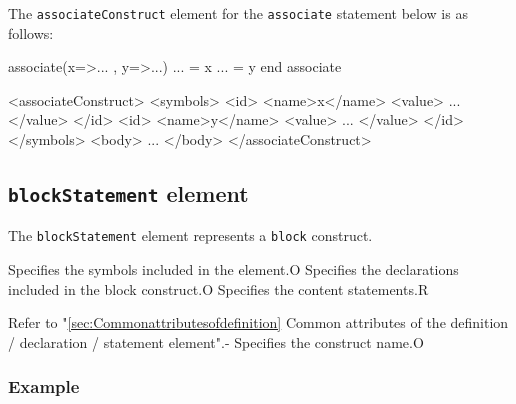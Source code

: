 The {\tt associateConstruct} element for the {\tt associate} statement below is as follows:
\vspace{2mm}

\begin{Fexample2008}
associate(x=>... , y=>...)
 ... = x
 ... = y
end associate
\end{Fexample2008}
\vspace{1mm}

\begin{XcodeMLFExample}
<associateConstruct>
  <symbols>
    <id>
      <name>x</name>
      <value>
        ...
      </value>
    </id>
    <id>
      <name>y</name>
      <value>
        ...
      </value>
    </id>
  </symbols>
  <body>
     ...
  </body>
</associateConstruct>
\end{XcodeMLFExample}


\subsection{ {\tt blockStatement} element}

The {\tt blockStatement} element represents a {\tt block} construct.


\begin{XcodeMLChildElements}
{Specifies the symbols included in the element.}{O}
{Specifies the declarations included in the block construct.}{O}
{Specifies the content statements.}{R}
\end{XcodeMLChildElements}

\begin{XcodeMLAttributes}
{Refer to "\ref{sec:Commonattributesofdefinition} Common attributes of the definition / declaration / statement element".}{-}
{Specifies the construct name.}{O}
\end{XcodeMLAttributes}

\subsubsection*{Example}


